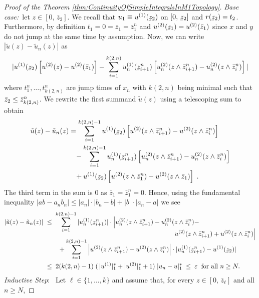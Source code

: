 \documentclass[11pt]{article}
\theoremstyle{definition}\newtheorem{example}[theorem]{Example}
\theoremstyle{definition}\newtheorem{counterexample}[theorem]{Counterexample}
\theoremstyle{definition}\newtheorem{remark}[theorem]{Remark}
\theoremstyle{definition}\newtheorem{defi}[theorem]{Definition}
\numberwithin{equation}{section}
\newcommand{\ubar}[1]{\underaccent{\bar}{#1}}
\renewcommand{\|}{\; : \, \;}											%
\begin{document}
\begin{proof}[Proof of the Theorem \ref{thm:ContinuityOfSimpleIntegralsInM1Topology}]
	\emph{Base case:}\ 
	let $z \in [0,\,\bar{z}_2]$. We recall that $u_1 \equiv u^{(1)}(\ubar{z}_2)$ on $[0,\, \ubar{z}_2] $ and $r(\ubar{z}_2) = t_2$. Furthermore, by definition $t_1 = 0 = \bar{z}_1 = \bar{z}^n_1 $ and $u^{(2)}(\ubar{z}_1) = u^{(2)}(\bar{z}_1)$ since $x$ and $y$ do not jump at the same time by assumption. Now, we can write $|\tilde{u}(z) - \tilde{u}_{n}(z)|$ as
	$$ |u^{(1)}(\ubar{z}_2)\left[u^{(2)}(z)-u^{(2)}(\bar{z}_1)\right] - \sum_{i=1}^{k(2,n)} u_n^{(1)}(\ubar{z}^n_{i+1})  \left[u_n^{(2)}(z \wedge \bar{z}^n_{i+1}) - u_n^{(2)}(z \wedge \bar{z}^n_{i})\right]|$$
	where $t_1^n, \ldots, t_{k(2,n)}^n$ are jump times of $x_n$ with $k(2,n)$ being minimal such that $\Bar{z}_2  \leq  \bar{z}_{k(2,n)}^n$. We rewrite the first summand $\tilde{u}(z)$ using a telescoping sum to obtain
	\begin{align*}
		\tilde{u}(z) - \tilde{u}_n(z) &= \sum_{i=1}^{k(2,n)-1} u^{(1)}(\ubar{z}_{2}) \left[u^{(2)}(z \wedge \bar{z}^n_{i+1}) - u^{(2)}(z \wedge \bar{z}^n_{i})\right]\\
		&\;\;\; - \sum_{i=1}^{k(2,n)-1}  u_n^{(1)}(\ubar{z}^n_{i+1})\left[u_n^{(2)}(z \wedge \bar{z}^n_{i+1}) - u_n^{(2)}(z \wedge \bar{z}^n_{i})\right] \\ &\;\;\;+  u^{(1)}(\ubar{z}_{2}) \left[u^{(2)}(z \wedge \bar{z}^n_{1}) - u^{(2)}(z \wedge \bar{z}_{1})\right]\; .
	\end{align*}
	The third term in the sum is $0$ as $\bar{z}_1 = \bar{z}^n_1=0$. Hence, using the fundamental inequality $|ab-a_n b_n| \leq |a_n|\cdot|b_n - b| + |b|\cdot |a_n - a|$ we see
	\begin{align*}
		|\tilde{u}(z) - \tilde{u}_n(z)| \; &\leq \; \sum_{i=1}^{k(2,n)-1} |u_n^{(1)}(\ubar{z}^n_{i+1})| \cdot \Bigl|u_n^{(2)}(z \wedge \bar{z}^n_{i+1}) - u_n^{(2)}(z \wedge \bar{z}^n_{i}) - \\[-10pt]
		&\hspace{200pt} u^{(2)}(z \wedge \bar{z}^n_{i+1}) + u^{(2)}(z \wedge \bar{z}^n_{i})\Bigr| \\[-6pt]
		&\qquad + \sum_{i=1}^{k(2,n)-1} \left|u^{(2)}(z \wedge \bar{z}^n_{i+1}) - u^{(2)}(z \wedge \bar{z}^n_{i})\right| \cdot |u_n^{(1)}(\ubar{z}^n_{i+1}) - u^{(1)}(\ubar{z}_{2})| \\
		&\leq \; 2  (k(2,n) - 1) \; (\,|u^{(1)}|^*_1 + |u^{(2)}|^*_1 + 1) \; |u_n - u|^*_1 \;\leq \; \varepsilon \;\; \text{for all } n\geq N.
	\end{align*}
	\emph{Inductive Step}: \
	Let $\ell \in \{1, \ldots, k\}$ and assume that, for every $z \in [0,\, \bar{z}_\ell]$ and all $n \geq N$,

\end{proof}
\end{document}
